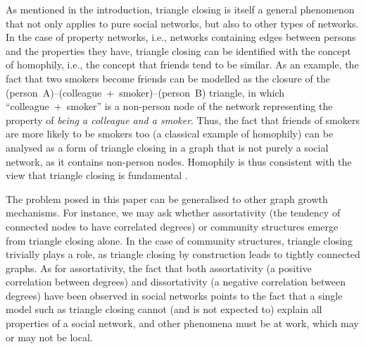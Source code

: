 \documentclass{jimis-final-en}
\begin{document}
As mentioned in the introduction, triangle closing is itself a general
phenomenon that not only applies to pure social networks, but also to
other types of networks.  In the case of property networks, i.e.,
networks containing edges between persons and the properties they have,
triangle closing can be identified with the concept of homophily, i.e.,
the concept that friends tend to be similar.  As an example, the fact
that two smokers become friends can be modelled as the closure of the
(person~A)--(colleague~+~smoker)--(person~B) triangle, in which
``colleague~+~smoker'' is a non-person 
node of the network representing the property of \emph{being a colleague
  and a smoker}.
Thus, the fact that friends of smokers are more likely to be smokers
too (a classical example of homophily) can be analysed as a form of
triangle closing in a graph that is not purely a social network, as it
contains non-person nodes.  Homophily is thus consistent with the view
that triangle closing is fundamental \citep{shalizi2011homophily}. 

The problem posed in this paper can be generalised to other graph growth
mechanisms.  For instance, we may ask whether assortativity (the
tendency of connected nodes to have correlated degrees) or community
structures emerge from triangle closing alone.  In the case of community
structures, triangle closing trivially plays a role, as triangle closing
by construction leads to tightly connected graphs.  As for
assortativity, the fact that both assortativity (a positive correlation
between degrees) and dissortativity (a negative correlation between
degrees) have been observed in social networks points to the fact that a
single model such as triangle closing cannot (and is not expected to)
explain all properties of a social network, and other phenomena must be
at work, which may or may not be local. 



\end{document}
